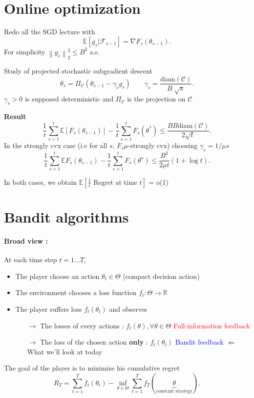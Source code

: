 \section{Online optimization}
Redo all the SGD lecture with 
\[
    \mathbb{E}[g_s | \mathcal{F}_{s-1}] = \nabla F_s (\theta _{s-1})
.\]
For simplicity $ \left\| g_s \right\| _2 ^2 \leq B ^2 $ a.s.

Study of projected stochastic subgradient descent 
\[
    \theta _s = \Pi _\mathcal{C} (\theta _{s-1} - \gamma _s g_s) \qquad \gamma _s = \frac{\text{diam}(\mathcal{C})}{B \sqrt[]{s}}
.\]
$\gamma _s > 0$ is supposed deterministic and $\Pi _\mathcal{C}$ is the projection on $\mathcal{C}$

\textbf{Result} 
\[
    \frac{1}{t} \sum_{s=1}^{t}\mathbb{E}[ F_s(\theta _{s-1}) ] - \frac{1}{t}\sum_{s=1}^{t} F_s (\theta^\ast ) \leq \frac{B B \text{diam}(\mathcal{C})}{2 \sqrt{t}}
.\]
In the strongly cvx case (i.e for all $s$, $F_s \mu$-strongly cvx)
choosing  $ \gamma _s = 1 / \mu s $ 
\[
    \frac{1}{t}\sum_{s=1}^{t}\mathbb{E}F_s(\theta _{s-1}) - \frac{1}{t}\sum_{s=1}^{t}F_s(\theta ^\star ) \leq \frac{B^2}{2 \mu t} (1 + \log t )
.\]

In both cases, we obtain $\mathbb{E}[\frac{1}{t} \text{ Regret at time }t]$ = o(1)

\section{Bandit algorithms}
\paragraph*{Broad view :} At each time step $t = 1 \dots T$, 
\begin{itemize}
    \item The player choose an action $\theta _t \in \Theta $ (compact decision action)
    \item The environment chooses a loss function $ f_t : \Theta \to \mathbb{R} $ 
    \item The player suffers loss $ f_t (\theta _t) $ and observes \begin{itemize}
        \item [$\rightarrow$] The losses of every actions : $ f_t (\theta ), \forall \theta \in \Theta  $ \textcolor{red}{Full-information feedback}
        \item [$\rightarrow$] The loss of the chosen action \textbf{only} : $ f_t(\theta _t) $ \textcolor{blue}{Bandit feedback} $ \Leftarrow  $ What we'll look at today
    \end{itemize}
\end{itemize}
The goal of the player is to minimize his cumulative regret 
\[
    R_T = \sum_{t=1}^{T}f_t(\theta _t) - \inf _{\theta \in \Theta } \sum_{t=1}^{T} f_T(\underbrace{\theta }_{\text{constant strategy}})
.\]

